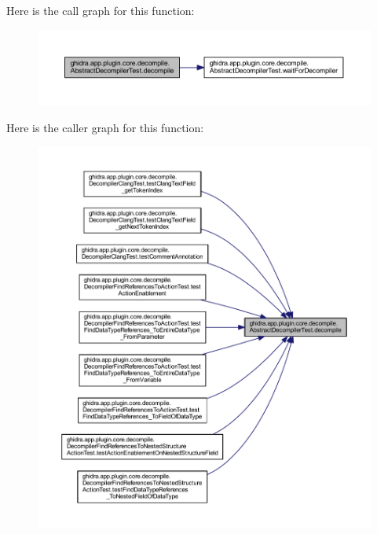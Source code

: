 Here is the call graph for this function\+:
\nopagebreak
\begin{figure}[H]
\begin{center}
\leavevmode
\includegraphics[width=350pt]{classghidra_1_1app_1_1plugin_1_1core_1_1decompile_1_1_abstract_decompiler_test_a9d26f26311f687312c38172ea301e048_cgraph}
\end{center}
\end{figure}
Here is the caller graph for this function\+:
\nopagebreak
\begin{figure}[H]
\begin{center}
\leavevmode
\includegraphics[width=350pt]{classghidra_1_1app_1_1plugin_1_1core_1_1decompile_1_1_abstract_decompiler_test_a9d26f26311f687312c38172ea301e048_icgraph}
\end{center}
\end{figure}
\mbox{\label{classghidra_1_1app_1_1plugin_1_1core_1_1decompile_1_1_abstract_decompiler_test_a3cf71446efa71e0a76b812ebffa38080}} 
